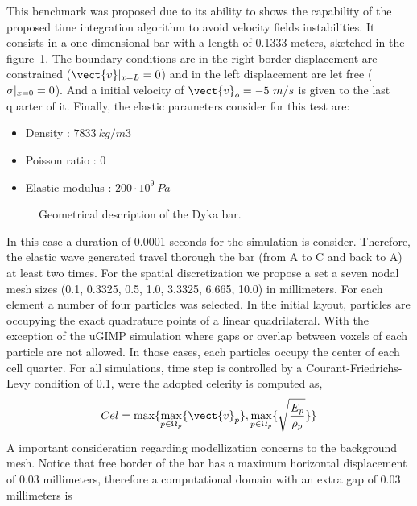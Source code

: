 This benchmark was proposed due to its ability to shows the capability
of the proposed time integration algorithm to avoid velocity
fields instabilities. It consists in a one-dimensional bar with a
length of 0.1333 meters, sketched in the
figure~\ref{fig:Dyka_Bar}. The boundary conditions are in the right
border displacement are constrained ($\vect{v} \rvert_{x=L} = 0$) and
in the left displacement are let free ($\mathsf{\sigma} \rvert_{x=0} =
0$). And a initial velocity of $\vect{v}_o = - 5\ m/s$ is given to the
last quarter of it. Finally, the elastic parameters consider for this test are:
\begin{itemize} 
\item  Density : $7833\ kg/m3$
\item  Poisson ratio : $0$
\item  Elastic modulus : $200 \cdot 10^9\ Pa$
\end{itemize}
\begin{figure}\sidecaption
  \centering
  \resizebox{\hsize}{!}{
    }
  \caption{Geometrical description of the Dyka \cite{Dyka1995} bar.}
  \label{fig:Dyka_Bar}
\end{figure}
In this case a duration of 0.0001 seconds for the simulation is
consider. Therefore, the elastic wave generated travel thorough the bar
(from A to C and back to A) at least two times. For the spatial
discretization we propose a set a seven nodal mesh sizes (0.1, 0.3325, 0.5,
1.0, 3.3325, 6.665, 10.0) in millimeters. For each element a number of
four particles was selected. In the initial layout, particles are
occupying the exact quadrature points of a linear quadrilateral. With
the exception of the uGIMP simulation where gaps or overlap between
voxels of each particle are not allowed. In those cases, each particles
occupy the center of each cell quarter. For all simulations, time step
is controlled by a Courant-Friedrichs-Levy condition of 0.1, were the adopted
celerity is computed as,
\begin{equation}
  \label{eq:Cel}
  Cel = \max\{\max_{p \in \Omega_p}\{ \vect{v}_p \} , \max_{p \in \Omega_p}\{ \sqrt{\frac{E_p}{\rho_p}} \} \}
\end{equation}
A important consideration regarding modellization concerns to the
background mesh. Notice that free border of the bar has a maximum
horizontal displacement of 0.03 millimeters, therefore 
a computational domain with an extra gap of 0.03 millimeters is

